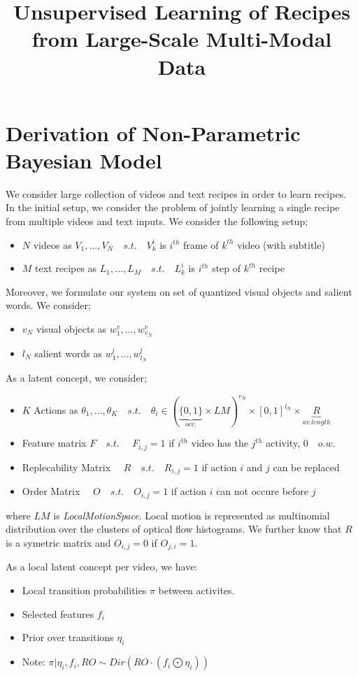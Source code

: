 \documentclass{article}
\title{Unsupervised Learning of Recipes from Large-Scale Multi-Modal Data}
\begin{document}
\maketitle
\section{Derivation of Non-Parametric Bayesian Model}
We consider large collection of videos and text recipes in order to learn recipes. In the initial setup, we consider the problem of jointly learning a single recipe from multiple videos and text inputs. We consider the following setup;
\begin{itemize}
  \item $N$ videos as $V_1,\ldots,V_N \quad s.t. \quad  V_k^i$ is $i^{th}$ frame of $k^{th}$ video (with subtitle)
  \item $M$ text recipes as $L_1,\ldots,L_M \quad  s.t. \quad  L_k^i$ is $i^{th}$ step of $k^{th}$ recipe
\end{itemize}
Moreover, we formulate our system on set of quantized visual objects and salient words. We consider;
\begin{itemize}
  \item $v_N$ visual objects as $w^v_1,\ldots,w^v_{v_N}$
  \item $l_N$ salient words as $w^l_1,\ldots,w^l_{l_N}$
\end{itemize}
As a latent concept, we consider;
\begin{itemize}
  \item $K$ Actions as $\theta_1,\ldots,\theta_K \quad s.t. \quad \theta_i \in \left(\underbrace{\{0,1\}}_{occ.}\times LM\right)^{v_N} \times [0,1]^{l_N} \times \underbrace{R}_{av.length}$
  \item Feature matrix $F \quad s.t. \quad$ $F_{i,j}=1$ if $i^{th}$ video has the $j^{th}$ activity, $0 \quad o.w.$
  \item Replecability Matrix $\quad R\quad s.t. \quad R_{i,j}=1$ if action $i$ and $j$ can be replaced
  \item Order Matrix $\quad O\quad s.t. \quad O_{i,j}=1$ if action $i$ can not occure before $j$
\end{itemize}
where $LM$ is \emph{LocalMotionSpace}. Local motion is represented as multinomial distribution over the clusters of optical flow histograms. We further know that $R$ is a symetric matrix and $O_{i,j}=0$ if $O_{j,i}=1$.

As a local latent concept per video, we have:
\begin{itemize}
  \item Local transition probabilities $\pi$ between activites.
  \item Selected features $f_i$
  \item Prior over transitions $\eta_i$
  \item Note: $\pi|\eta_i,f_i,RO \sim Dir\left(RO \cdot(f_i \bigodot \eta_i)\right)$
\end{itemize}
\end{document}
